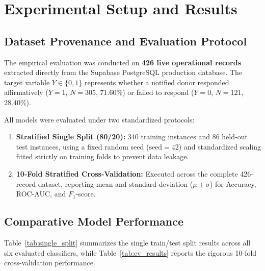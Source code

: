\documentclass[conference]{IEEEtran}
\begin{document}
\section{Experimental Setup and Results}

\subsection{Dataset Provenance and Evaluation Protocol}
The empirical evaluation was conducted on \textbf{426 live operational records} extracted directly from the Supabase PostgreSQL production database. The target variable $Y \in \{0, 1\}$ represents whether a notified donor responded affirmatively ($Y=1$, $N=305$, $71.60\%$) or failed to respond ($Y=0$, $N=121$, $28.40\%$).

All models were evaluated under two standardized protocols:
\begin{enumerate}
    \item \textbf{Stratified Single Split (80/20):} 340 training instances and 86 held-out test instances, using a fixed random seed ($\text{seed}=42$) and standardized scaling fitted strictly on training folds to prevent data leakage.
    \item \textbf{10-Fold Stratified Cross-Validation:} Executed across the complete 426-record dataset, reporting mean and standard deviation ($\mu \pm \sigma$) for Accuracy, ROC-AUC, and $F_1$-score.
\end{enumerate}

\subsection{Comparative Model Performance}
Table~\ref{tab:single_split} summarizes the single train/test split results across all six evaluated classifiers, while Table~\ref{tab:cv_results} reports the rigorous 10-fold cross-validation performance.
\end{document}
